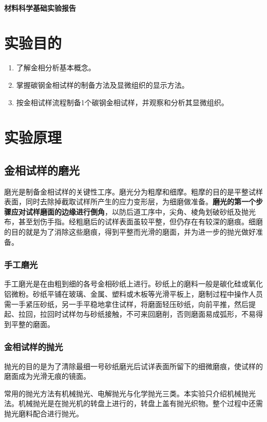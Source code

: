 \documentclass[a4paper,utf8]{article}
\begin{document}
\begin{center}
    {\mbox{}\\[7em]\bfseries\songti%
    材料科学基础实验报告}\\[34mm]
\end{center}
\newpage
\section{实验目的}
    \begin{enumerate}
        \item 了解金相分析基本概念。
        \item 掌握碳钢金相试样的制备方法及显微组织的显示方法。
        \item 按金相试样流程制备1个碳钢金相试样，并观察和分析其显微组织。
    \end{enumerate}
\section{实验原理}%
    \subsection{金相试样的磨光}
    磨光是制备金相试样的关键性工序。磨光分为粗摩和细摩。粗摩的目的是平整试样表面，同时去除掉截取试样所产生的应力变形层，为细磨做准备。\textbf{磨光的第一个步骤应对试样磨面的边缘进行倒角}，以防后道工序中，尖角、棱角划破砂纸及抛光布，甚至划伤手指。经粗磨后的试样表面虽较平整，但仍存在有较深的磨痕。细磨的目的就是为了消除这些磨痕，得到平整而光滑的磨面，并为进一步的抛光做好准备。
        \subsubsection{手工磨光}
        手工磨光是在由粗到细的各号金相砂纸上进行。砂纸上的磨料一般是碳化硅或氧化铝微粉。砂纸平铺在玻璃、金属、塑料或木板等光滑平板上，磨制过程中操作人员需一手紧压砂纸，另一手平稳地拿住试样，将磨面轻压砂纸，向前平推，然后提起、拉回，拉回时试样勿与砂纸接触，不可来回磨削，否则磨面易成弧形，不易得到平整的磨面。
        \subsubsection{金相试样的抛光}
        抛光的目的是为了清除最细一号砂纸磨光后试详表面所留下的细微磨痕，使试样的磨面成为光滑无痕的镜面。\par
        常用的抛光方法有机械抛光、电解抛光与化学抛光三类。本实验只介绍机械抛光法。机械抛光是在抛光机的转盘上进行的，转盘上盖有抛光织物。整个过程中还需抛光磨料配合进行抛光。
\end{document}
